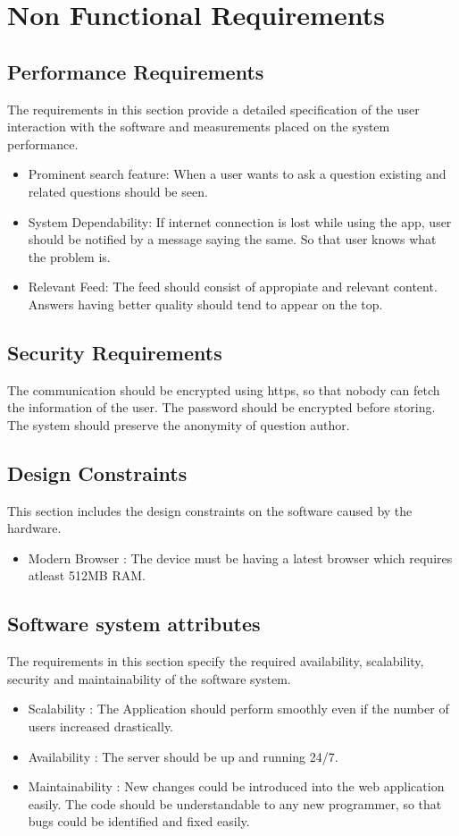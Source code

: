 \documentclass[journal,12pt,onecolumn,draftclsnofoot,]{IEEEtran}
\begin{document}
\section{Non Functional Requirements}


\subsection{Performance Requirements}
The requirements in this section provide a detailed specification of the user interaction with the software and measurements placed on the system performance.
\begin{itemize}
\item Prominent search feature: When a user wants to ask a question existing and related questions should be seen.
\item System Dependability: If internet connection is lost while using the app, user should be notified by a message saying the same. So that user knows what the problem is.
\item Relevant Feed: The feed should consist of appropiate and relevant content. Answers having better quality should tend to appear on the top.
\end{itemize}

\subsection{Security Requirements}
The communication should be encrypted using https, so that nobody can fetch the information of the user. The password should be encrypted before storing. The system should preserve the anonymity of question author.

\subsection{Design Constraints}
This section includes the design constraints on the software caused by the hardware.
\begin{itemize}
\item Modern Browser : The device must be having a latest browser which requires atleast 512MB RAM.
\end{itemize}

\subsection{Software system attributes}
The requirements in this section specify the required availability, scalability, security and maintainability of the software system.
\begin{itemize}
\item Scalability : The Application should perform smoothly even if the number of users increased drastically.
\item Availability : The server should be up and running 24/7.
\item Maintainability : New changes could be introduced into the web application easily. The code should be understandable to any new programmer, so that bugs could be identified and fixed easily.
\end{itemize}
\end{document}
